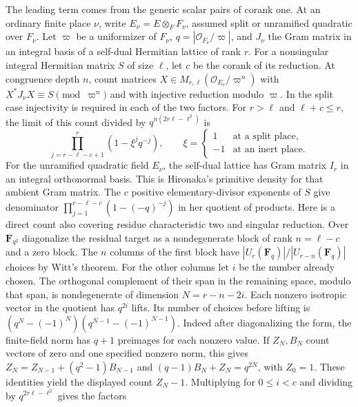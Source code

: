 \leavevmode{}%
The leading term comes from the generic scalar pairs of corank one.
At an ordinary finite place \(\nu\), write \(E_\nu=E\otimes_F F_\nu\),
assumed split or unramified quadratic over \(F_\nu\). Let \(\varpi\)
be a uniformizer of \(F_\nu\), \(q=|\mathcal O_{F_\nu}/\varpi|\),
and \(J_\nu\) the Gram matrix in an integral basis of a self-dual
Hermitian lattice of rank \(r\). For a nonsingular integral Hermitian
matrix \(S\) of size \(\ell\), let \(c\) be the corank of its reduction.
At congruence depth \(n\), count matrices
\(X\in M_{r,\ell}(\mathcal O_{E_\nu}/\varpi^n)\) with
\(X^*J_\nu X\equiv S\pmod{\varpi^n}\) and with injective reduction
modulo \(\varpi\). In the split case injectivity is required in
each of the two factors. For \(r>\ell\) and \(\ell+c\le r\), the
limit of this count divided by \(q^{n(2r\ell-\ell^2)}\) is
\[
  \prod_{j=r-\ell-c+1}^{r}(1-\xi^j q^{-j}),\qquad
  \xi=\begin{cases}1 &\text{at a split place},\\ -1 &\text{at an inert place}.
       \end{cases}
\]
For the unramified quadratic field \(E_\nu\), the self-dual lattice
has Gram matrix \(I_r\) in an integral orthonormal basis. This is
Hironaka's primitive density for that ambient Gram matrix. The \(c\)
positive elementary-divisor exponents of \(S\) give denominator
\(\prod_{j=1}^{r-\ell-c}(1-(-q)^{-j})\) in her quotient of products.
\cite[Equation~(3.1), p.~573, and Corollary~3.3(i), p.~577]{tr3hironaka}
Here is a direct count also covering residue characteristic two and
singular reduction. Over \(\mathbf F_{q^2}\) diagonalize the residual
target as a nondegenerate block of rank \(n=\ell-c\) and a zero block.
The \(n\) columns of the first block have
\(|U_r(\mathbf F_q)|/|U_{r-n}(\mathbf F_q)|\) choices by Witt's
theorem. For the other columns let \(i\) be the number already chosen.
The orthogonal complement of their span in the remaining space,
modulo that span, is nondegenerate of dimension \(N=r-n-2i\).
Each nonzero isotropic vector in the quotient has \(q^{2i}\) lifts.
Its number of choices before lifting is
\((q^N-(-1)^N)(q^{N-1}-(-1)^{N-1})\). Indeed after diagonalizing
the form, the finite-field norm has \(q+1\) preimages for each nonzero
value. If \(Z_N,B_N\) count vectors of zero and one specified nonzero
norm, this gives \(Z_N=Z_{N-1}+(q^2-1)B_{N-1}\) and
\((q-1)B_N+Z_N=q^{2N}\), with \(Z_0=1\). These identities yield
the displayed count \(Z_N-1\). Multiplying for \(0\le i<c\)
and dividing by \(q^{2r\ell-\ell^2}\) gives the factors
